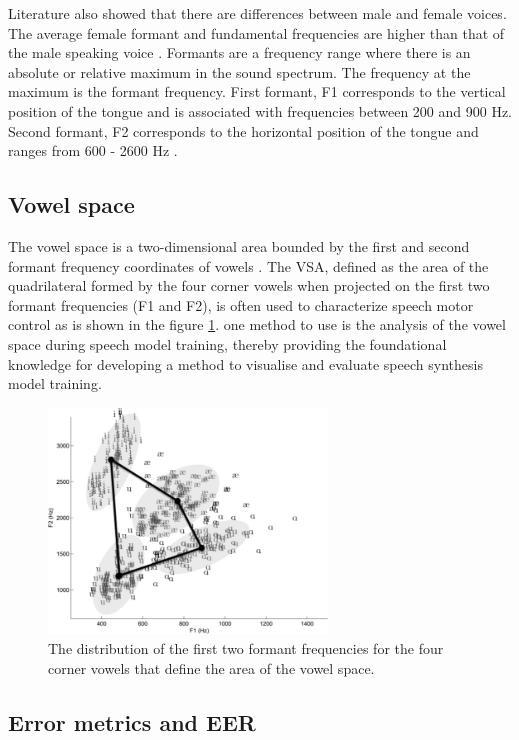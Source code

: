 Literature also showed that there are differences between male and female voices. The average female formant and fundamental frequencies are higher than that of the male speaking voice \cite{wu1991gender}. Formants are a frequency range where there is an absolute or relative maximum in the sound spectrum. The frequency at the maximum is the formant frequency\cite{pierce2019acoustics}. First formant, F1 corresponds to the vertical position of the tongue and is associated with frequencies between 200 and 900 Hz. Second formant, F2 corresponds to the horizontal position of the tongue and ranges from 600 - 2600 Hz \cite{watson1998acoustic}.

\subsection{Vowel space}
The vowel space is a two-dimensional area bounded by the first and second formant frequency coordinates of vowels \cite{sandoval2013automatic}. The \ac{VSA}, defined as the area of the quadrilateral formed by the four corner vowels when projected on the first two formant frequencies (F1 and F2), is often used to characterize speech motor control \cite{berisha2014characterizing} as is shown in the figure \ref{fig:vowel}. one method to use is the analysis of the vowel space during speech model training, thereby providing the foundational knowledge for developing a method to visualise and evaluate speech synthesis model training\cite{abeysinghe2022visualising}.

\begin{figure}
    \centering
    \includegraphics[height=6cm]{figures/vowel_space.png}
    \caption{The distribution of the first two formant frequencies for the four corner vowels that define the area of the vowel space.}
    \label{fig:vowel}
\end{figure}

\subsection{Error metrics and EER}

